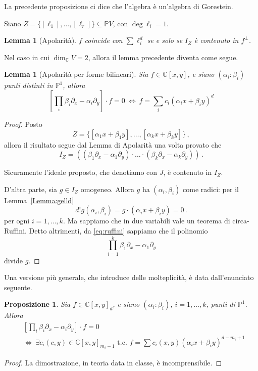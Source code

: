 \documentclass[a4paper, 11pt]{article}
\theoremstyle{definition}
\theoremstyle{plain}
\newtheorem{Lemma}[Def]{Lemma}
\newtheorem{Prop}[Def]{Proposizione}
\newcommand{\PP}{\mathbb{P}}
\newcommand{\C}{\mathbb{C}}
\begin{document}
La precedente proposizione ci dice che l'algebra è un'algebra di Gorestein. 

Siano $Z = \{[\ell_1], \dots, [\ell_r]\} \subseteq \PP V$, con $\deg \ell_i = 1$.
\begin{Lemma}[Apolarità]
	$f$ coincide con $\sum \ell_i^d$ se e solo se $I_Z$ è contenuto in $f^\bot$.
\end{Lemma}

Nel caso in cui $\dim_\C V = 2$, allora il lemma precedente diventa come segue.
\begin{Lemma}[Apolarità per forme bilineari]
	Sia $f \in \C[x,y]$, e siano $(\alpha_i \colon \beta_i)$ punti distinti in $\PP^1$, allora
	\[
		\left[\prod_i \beta_i \partial_x - \alpha_i\partial_y\right] \cdot f = 0 \ \Leftrightarrow\ f = \sum_i c_i(\alpha_i x + \beta_i y)^d
	\]
\end{Lemma}
\begin{proof}
	Posto
	\[
		Z = \{[\alpha_1 x + \beta_1 y], \dots, [\alpha_k x + \beta_k y]\}\,,
	\]
	allora il risultato segue dal Lemma di Apolarità una volta provato che
	\[
		I_Z = ((\beta_1\partial_x - \alpha_1\partial_y)\cdot\dots\cdot(\beta_k\partial_x - \alpha_k\partial_y))\,.
	\]
	
	Sicuramente l'ideale proposto, che denotiamo con $J$, è contenuto in $I_Z$.
	
	D'altra parte, sia $g \in I_Z$ omogeneo. Allora $g$ ha $(\alpha_i, \beta_i)$ come radici: per il Lemma~\ref{Lemma:gelld} 
	\begin{equation}\label{eq:ruffini}
		d!g(\alpha_i,\beta_i) = g\cdot (\alpha_i x + \beta_iy) = 0\,.
	\end{equation}
	per ogni $i = 1,\dots, k$. Ma sappiamo che in due variabili vale un teorema di circa-Ruffini. Detto altrimenti, da \eqref{eq:ruffini} sappiamo che il polinomio
	\[
		\prod_{i = 1}^k \beta_1\partial_x - \alpha_1 \partial_y
	\]
	divide $g$.
\end{proof}

Una versione più generale, che introduce delle molteplicità, è data dall'enunciato seguente.
\begin{Prop}
	Sia $f \in \C[x,y]_d$, e siano $(\alpha_i \colon \beta_i)$, $i = 1,\dots, k$, punti di $\PP^1$. Allora
	\[
	\begin{split}
		&\left[\prod_i \beta_i \partial_x - \alpha_i\partial_y\right]\cdot f = 0 \\
		&\Leftrightarrow\ \exists c_i(c,y) \in \C[x,y]_{m_i -1} \text{ t.c. }f = \sum c_i(x,y) (\alpha_i x + \beta_i y)^{d-m_i +1}
	\end{split}
	\]
\end{Prop}
\begin{proof}
	La dimostrazione, in teoria data in classe, è incomprensibile.
\end{proof}
\end{document}

